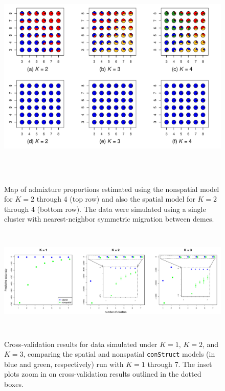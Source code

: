 \documentclass[12pt]{article}
\begin{document}
\begin{figure}
	\centering
		{\includegraphics[width=6in,height=4in]{figs/sims/Fig2_simK1_sp_vs_nsp.pdf}}
	\caption{
	Map of admixture proportions estimated using the nonspatial model for $K=2$ through 4 (top row)
	and also the spatial model for $K=2$ through 4 (bottom row).
	The data were simulated using a single cluster with nearest-neighbor symmetric migration between demes.
    }\label{simK1_pies}
\end{figure}

\begin{figure}
	\centering
		{\includegraphics[width=6in,height=2in]{figs/sims/sim_xvals.pdf}}
	\caption{
	Cross-validation results for data simulated under $K=1$, $K=2$, and $K=3$, 
	comparing the spatial and nonspatial \texttt{conStruct} models 
	(in blue and green, respectively) run with $K=1$ through 7.  
	The inset plots zoom in on cross-validation results outlined in the dotted boxes.
    }\label{sim_xvals}
\end{figure}
\end{document}
